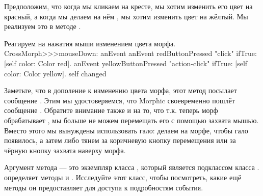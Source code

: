 \documentclass[a4paper,10pt,twoside]{book}
\begin{document}
Предположим, что когда мы кликаем на кресте, мы хотим изменить его цвет на красный, а когда мы делаем на нём \actclick, мы хотим изменить цвет на жёлтый.
Мы реализуем это в методе .

\begin{method}[mouseDown]{Реагируем на нажатия мыши изменением цвета морфа.}
CrossMorph>>>mouseDown: anEvent
	anEvent redButtonPressed "click"
		ifTrue: [self color: Color red].
	anEvent yellowButtonPressed "action-click"
		ifTrue: [self color: Color yellow].
	self changed
\end{method}

Заметьте, что в дополение к изменению цвета морфа, этот метод посылает сообщение .
Этим мы удостоверяемся, что Morphic своевременно пошлёт сообщение .
Обратите внимание также и на то, что т.к. теперь морф обрабатывает , мы больше не можем перемещать его с помощью захвата мышью.
Вместо этого мы вынуждены использовать гало: делаем \metaclick на морфе, чтобы гало появилось, а затем либо тянем за коричневую кнопку перемещения \moveHandle{} или за чёрную кнопку захвата \grabHandle{} наверху морфа.

Аргумент  метода  --- это экземпляр класса \mbox{,} который является подклассом класса .  определяет методы  и . Исследуйте этот класс, чтобы посмотреть, какие ещё методы он предоставляет для доступа к подробностям события.
\end{document}
